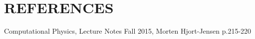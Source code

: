 \documentclass[a4paper]{article}
\begin{document}
\section{REFERENCES}
\begin{thebibliography}{9}
	Computational Physics, Lecture Notes Fall 2015, Morten Hjort-Jensen p.215-220
\end{thebibliography}




\end{document}
